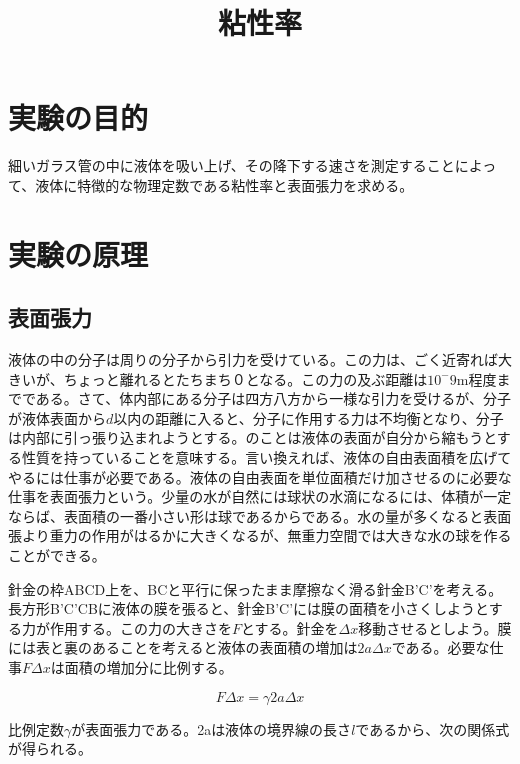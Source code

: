 \documentclass{jsarticle}
\begin{document}
\title{粘性率}
\author{\empty}
\date{\empty}
\maketitle

\section{実験の目的}

細いガラス管の中に液体を吸い上げ、その降下する速さを測定することによって、液体に特徴的な物理定数である粘性率と表面張力を求める。

\section{実験の原理}

\subsection{表面張力}

液体の中の分子は周りの分子から引力を受けている。この力は、ごく近寄れば大きいが、ちょっと離れるとたちまち０となる。この力の及ぶ距離は$10^-9$m程度までである。さて、体内部にある分子は四方八方から一様な引力を受けるが、分子が液体表面から$d$以内の距離に入ると、分子に作用する力は不均衡となり、分子は内部に引っ張り込まれようとする。のことは液体の表面が自分から縮もうとする性質を持っていることを意味する。言い換えれば、液体の自由表面積を広げてやるには仕事が必要である。液体の自由表面を単位面積だけ加させるのに必要な仕事を表面張力という。少量の水が自然には球状の水滴になるには、体積が一定ならば、表面積の一番小さい形は球であるからである。水の量が多くなると表面張より重力の作用がはるかに大きくなるが、無重力空間では大きな水の球を作ることができる。\\
\par 針金の枠ABCD上を、BCと平行に保ったまま摩擦なく滑る針金B'C'を考える。長方形B'C'CBに液体の膜を張ると、針金B'C'には膜の面積を小さくしようとする力が作用する。この力の大きさを$F$とする。針金を$\Delta x$移動させるとしよう。膜には表と裏のあることを考えると液体の表面積の増加は$2a\Delta x$である。必要な仕事$F\Delta x$は面積の増加分に比例する。

\begin{equation}
     F\Delta x = \gamma 2a\Delta x
\end{equation}

比例定数$\gamma$が表面張力である。2aは液体の境界線の長さ$l$であるから、次の関係式が得られる。
\end{document}
